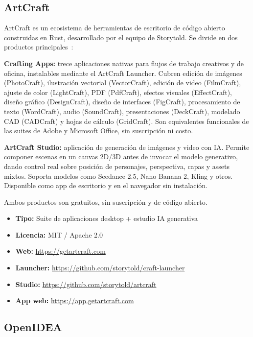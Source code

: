 \documentclass[conference]{IEEEtran}
\begin{document}
\subsection{ArtCraft}

ArtCraft es un ecosistema de herramientas de escritorio de código
abierto construidas en Rust, desarrollado por el equipo de Storytold.
Se divide en dos productos principales~\cite{artcraft}:

\textbf{Crafting Apps:} trece aplicaciones nativas para flujos de
trabajo creativos y de oficina, instalables mediante el ArtCraft
Launcher. Cubren edición de imágenes (PhotoCraft), ilustración
vectorial (VectorCraft), edición de video (FilmCraft), ajuste de
color (LightCraft), PDF (PdfCraft), efectos visuales (EffectCraft),
diseño gráfico (DesignCraft), diseño de interfaces (FigCraft),
procesamiento de texto (WordCraft), audio (SoundCraft), presentaciones
(DeckCraft), modelado CAD (CADCraft) y hojas de cálculo (GridCraft).
Son equivalentes funcionales de las suites de Adobe y Microsoft
Office, sin suscripción ni costo.

\textbf{ArtCraft Studio:} aplicación de generación de imágenes y
video con IA. Permite componer escenas en un canvas 2D/3D antes de
invocar el modelo generativo, dando control real sobre posición de
personajes, perspectiva, capas y assets mixtos. Soporta modelos como
Seedance 2.5, Nano Banana 2, Kling y otros. Disponible como app de
escritorio y en el navegador sin instalación.

Ambos productos son gratuitos, sin suscripción y de código abierto.

\begin{itemize}
  \item \textbf{Tipo:} Suite de aplicaciones desktop + estudio IA generativa
  \item \textbf{Licencia:} MIT / Apache 2.0
  \item \textbf{Web:} \url{https://getartcraft.com}
  \item \textbf{Launcher:} \url{https://github.com/storytold/craft-launcher}
  \item \textbf{Studio:} \url{https://github.com/storytold/artcraft}
  \item \textbf{App web:} \url{https://app.getartcraft.com}
\end{itemize}

\subsection{OpenIDEA}
\end{document}
